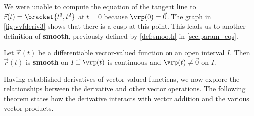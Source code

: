 
We were unable to compute the equation of the tangent line to $\vec r(t)=\bracket{t^3,t^2}$ at $t=0$ because $\vrp(0) = \vec 0$. The graph in \autoref{fig:vvfderiv3} shows that there is a cusp at this point. This leads us to another definition of \textbf{smooth}, previously defined by \autoref{def:smooth} in \autoref{sec:param_eqs}.

\begin{definition}\label{def:vector_smooth}
Let $\vec r(t)$ be a differentiable vector-valued function on an open interval $I$. Then $\vec r(t)$ is \textbf{smooth} on $I$ if $\vrp(t)$ is continuous and $\vrp(t)\neq \vec 0$ on $I$.
\end{definition}

Having established derivatives of vector-valued functions, we now explore the relationships between the derivative and other vector operations. The following theorem states how the derivative interacts with vector addition and the various vector products.


